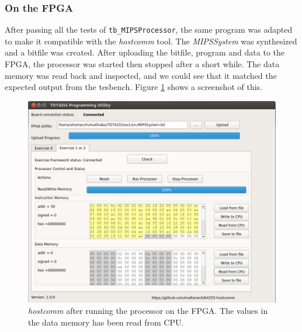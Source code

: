 \subsubsection{On the FPGA}
After passing all the tests of \texttt{tb\_MIPSProcessor},
the same program was adapted to make it compatible with the \textit{hostcomm} tool.
The \textit{MIPSSystem} was synthesized and a bitfile was created.
After uploading the bitfile, program and data to the FPGA,
the processor was started then stopped after a short while.
The data memory was read back and inspected,
and we could see that it matched the expected output from the tesbench.
Figure \ref{fig:hostcomm} shows a screenshot of this.

\begin{figure}[p]
    \centering
    \includegraphics[width=\textwidth]{img/Hostcomm}
    \caption{\textit{hostcomm} after running the processor on the FPGA. The values in the data memory has been read from CPU.}
    \label{fig:hostcomm}
\end{figure}

